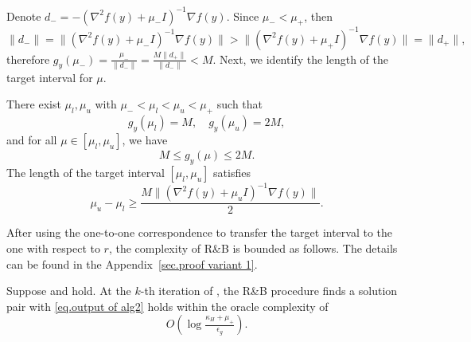 \documentclass[moor,sglanonrev]{informs4}
\begin{document}
Denote $d_- = -\left(\nabla^2 f(y)+\mu_-I\right)^{-1}\nabla f(y)$. Since $\mu_- <\mu_+$, then
\begin{equation*}
    \|d_-\|=\| (\nabla ^2 f(y)+\mu_- I )^{-1} \nabla f(y)\|>\| (\nabla ^2 f(y)+\mu_+ I )^{-1} \nabla f(y)\| = \|d_+\|,
\end{equation*}
therefore $g_y(\mu_-) = \frac{\mu_-}{\|d_-\|}=\frac{M\|d_+\|}{\|d_-\|}< M$.
\Halmos \endproof
Next, we identify the length of the target interval for $\mu$.
\begin{lemma}
    \label{lem.bound target interval}
    There exist $\mu_l,\mu_u$ with $\mu_-<\mu_l<\mu_u<\mu_+$ such that
    \begin{equation}\label{eq.target interval bracketing points}
        g_{y}(\mu_l)=M, \quad g_{y}(\mu_u)=2M,
    \end{equation}
    and for all $\mu\in[\mu_l,\mu_u]$, we have
    \begin{equation*}
        M\leq g_y(\mu) \leq2M.
    \end{equation*}
    The length of the target interval $[\mu_l,\mu_u]$ satisfies
    \begin{equation}
        \label{eq.bound target interval}
        \mu_u-\mu_l \geq \frac{M\| (\nabla ^2 f(y)+\mu_u I  )^{-1}\nabla f(y)\|}{2}.
    \end{equation}
\end{lemma}
After using the one-to-one correspondence to transfer the target interval to the one with respect to $r$, the complexity of R\&B is bounded as follows. The details can be found in the Appendix~\ref{sec.proof variant 1}.
\begin{lemma}
    \label{lem.bound initial interval}
    Suppose  and  hold. At the $k$-th iteration of , the R\&B procedure finds a solution pair with \eqref{eq.output of alg2} holds within the oracle complexity of 
    \begin{equation}
        \label{eq.complexity bisection}
        O\left(\log\tfrac{\kappa_H+\mu_+}{\epsilon_g}\right).
    \end{equation}
\end{lemma}
\end{document}
